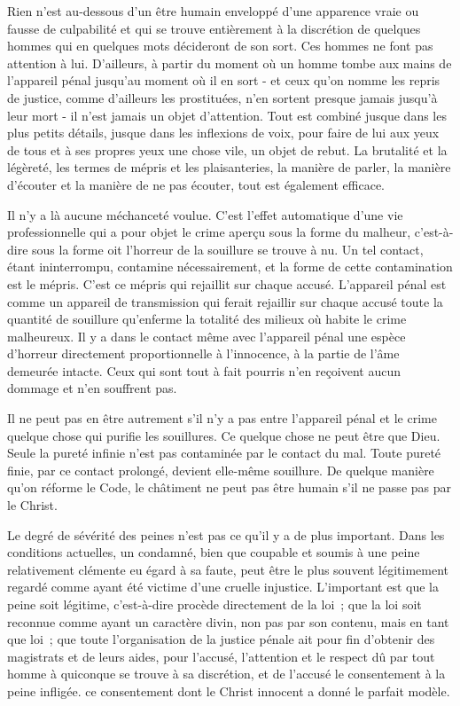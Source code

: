 \documentclass[french,twoside]{book} %
\begin{document}
Rien n'est au-dessous d'un être humain enveloppé d'une apparence vraie ou fausse de culpabilité et qui se trouve entièrement à la discrétion de quelques hommes qui en quelques mots décideront de son sort. Ces hommes ne font pas attention à lui. D'ailleurs, à partir du moment où un homme tombe aux mains de l'appareil pénal jusqu'au moment où il en sort - et ceux qu'on nomme les repris de justice, comme d'ailleurs les prostituées, n'en sortent presque jamais jusqu'à leur mort - il n'est jamais un objet d'attention. Tout est combiné jusque dans les plus petits détails, jusque dans les inflexions de voix, pour faire de lui aux yeux de tous et à ses propres yeux une chose vile, un objet de rebut. La brutalité et la légèreté, les termes de mépris et les plaisanteries, la manière de parler, la manière d'écouter et la manière de ne pas écouter, tout est également efficace.\par
Il n'y a là aucune méchanceté voulue. C'est l'effet automatique d'une vie professionnelle qui a pour objet le crime aperçu sous la forme du malheur, c'est-à-dire sous la forme oit l'horreur de la souillure se trouve à nu. Un tel contact, étant ininterrompu, contamine nécessairement, et la forme de cette contamination est le mépris. C'est ce mépris qui rejaillit sur chaque accusé. L'appareil pénal est comme un appareil de transmission qui ferait rejaillir sur chaque accusé toute la quantité de souillure qu'enferme la totalité des milieux où habite le crime malheureux. Il y a dans le contact même avec l'appareil pénal une espèce d'horreur directement proportionnelle à l'innocence, à la partie de l'âme demeurée intacte. Ceux qui sont tout à fait pourris n'en reçoivent aucun dommage et n'en souffrent pas.\par
Il ne peut pas en être autrement s'il n'y a pas entre l'appareil pénal et le crime quelque chose qui purifie les souillures. Ce quelque chose ne peut être que Dieu. Seule la pureté infinie n'est pas contaminée par le contact du mal. Toute pureté finie, par ce contact prolongé, devient elle-même souillure. De quelque manière qu'on réforme le Code, le châtiment ne peut pas être humain s'il ne passe pas par le Christ.\par
Le degré de sévérité des peines n'est pas ce qu'il y a de plus important. Dans les conditions actuelles, un condamné, bien que coupable et soumis à une peine relativement clémente eu égard à sa faute, peut être le plus souvent légitimement regardé comme ayant été victime d'une cruelle injustice. L'important est que la peine soit légitime, c'est-à-dire procède directement de la loi ; que la loi soit reconnue comme ayant un caractère divin, non pas par son contenu, mais en tant que loi ; que toute l'organisation de la justice pénale ait pour fin d'obtenir des magistrats et de leurs aides, pour l'accusé, l'attention et le respect dû par tout homme à quiconque se trouve à sa discrétion, et de l'accusé le consentement à la peine infligée. ce consentement dont le Christ innocent a donné le parfait modèle.\par
\end{document}
